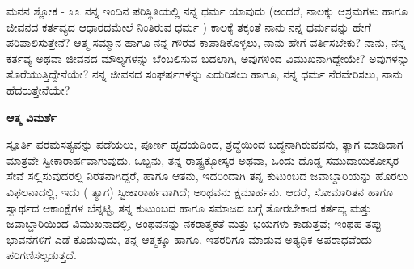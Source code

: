 \begin{mananam}{\mananamfont ಮನನ ಶ್ಲೋಕ - ೩೩}
\small \mananatext ನನ್ನ ಇಂದಿನ ಪರಿಸ್ಥಿತಿಯಲ್ಲಿ ನನ್ನ ಧರ್ಮ ಯಾವುದು (ಅಂದರೆ, ನಾಲಕ್ಕು ಆಶ್ರಮಗಳು ಹಾಗೂ ಜೀವನದ ಕರ್ತವ್ಯದ ಆಧಾರದಮೇಲೆ ನಿಂತಿರುವ ಧರ್ಮ ) ಕಾಲಕ್ಕೆ ತಕ್ಕಂತೆ ನಾನು ನನ್ನ ಧರ್ಮವನ್ನು ಹೇಗೆ ಪರಿಪಾಲಿಸುತ್ತೇನೆ? ಆತ್ಮ ಸಮ್ಮಾನ ಹಾಗೂ ನನ್ನ ಗೌರವ ಕಾಪಾಡಿಕೊಳ್ಳಲು, ನಾನು ಹೇಗೆ ವರ್ತಿಸಬೇಕು? ನಾನು, ನನ್ನ ಕರ್ತವ್ಯ ಅಥವಾ ಜೀವನದ ಮೌಲ್ಯಗಳನ್ನು ಬೆಂಬಲಿಸುವ ಬದಲಾಗಿ, ಅವುಗಳಿಂದ ವಿಮುಖನಾಗಿದ್ದೇಯೇ? ಅವುಗಳನ್ನು ತೊರೆಯುತ್ತಿದ್ದೇನೆಯೇ? ನನ್ನ ಜೀವನದ ಸಂಘರ್ಷಗಳನ್ನು ಎದುರಿಸಲು ಹಾಗೂ, ನನ್ನ ಧರ್ಮ ನೆರವೇರಿಸಲು, ನಾನು ಹೆದರುತ್ತೇನೆಯೇ?
\end{mananam}
\WritingHand\enspace\textbf{ಆತ್ಮ ವಿಮರ್ಶೆ}
\begin{inspiration}{\mananamfont ಸ್ಪೂರ್ತಿ}
\small \mananatext ಪರಮಸತ್ಯವನ್ನು ಪಡೆಯಲು, ಪೂರ್ಣ ಹೃದಯದಿಂದ, ಶ್ರದ್ಧೆಯಿಂದ ಬದ್ಧನಾಗಿರುವವನು, ತ್ಯಾಗ ಮಾಡಿದಾಗ ಮಾತ್ರವೇ ಸ್ವೀಕಾರಾರ್ಹವಾಗುವುದು. ಒಬ್ಬನು, ತನ್ನ ರಾಷ್ಟ್ರಕ್ಕೋಸ್ಕರ ಅಥವಾ, ಒಂದು ದೊಡ್ಡ ಸಮುದಾಯಕೋಸ್ಕರ ಸೇವೆ ಸಲ್ಲಿಸುವುದರಲ್ಲಿ ನಿರತನಾಗಿದ್ದರೆ, ಹಾಗೂ ಆತನು, ಇದರಿಂದಾಗಿ ತನ್ನ ಕುಟುಂಬದ ಜವಾಬ್ದಾರಿಯನ್ನು ಹೊರಲು ವಿಫಲನಾದಲ್ಲಿ, ಇದು ( ತ್ಯಾಗ) ಸ್ವೀಕಾರಾರ್ಹವಾಗಿದೆ; ಅಂಥವನು ಕ್ಷಮಾರ್ಹನು. ಆದರೆ, ಸೋಮಾರಿತನ ಹಾಗೂ ಸ್ವಾರ್ಥದ ಆಕಾಂಕ್ಷೆಗಳ ಬೆನ್ನಟ್ಟಿ, ತನ್ನ ಕುಟುಂಬದ ಹಾಗೂ ಸಮಾಜದ ಬಗ್ಗೆ ತೋರಬೇಕಾದ ಕರ್ತವ್ಯ  ಮತ್ತು ಜವಾಬ್ದಾರಿಯಿಂದ ವಿಮುಖನಾದಲ್ಲಿ, ಅಂಥವನನ್ನು ನಕರಾತ್ಮಕತೆ ಮತ್ತು ಭಯಗಳು ಕಾಡುತ್ತವೆ; ಇಂಥಹ ತಪ್ಪು ಭಾವನೆಗಳಿಗೆ ಎಡೆ ಕೊಡುವುದು, ತನ್ನ ಆತ್ಮಕ್ಕೂ ಹಾಗೂ, ಇತರರಿಗೂ ಮಾಡುವ ಅತ್ಯಧಿಕ ಅಪರಾಧವೆಂದು ಪರಿಗಣಿಸಲ್ಪಡುತ್ತದೆ. 
\end{inspiration}
\newpage



